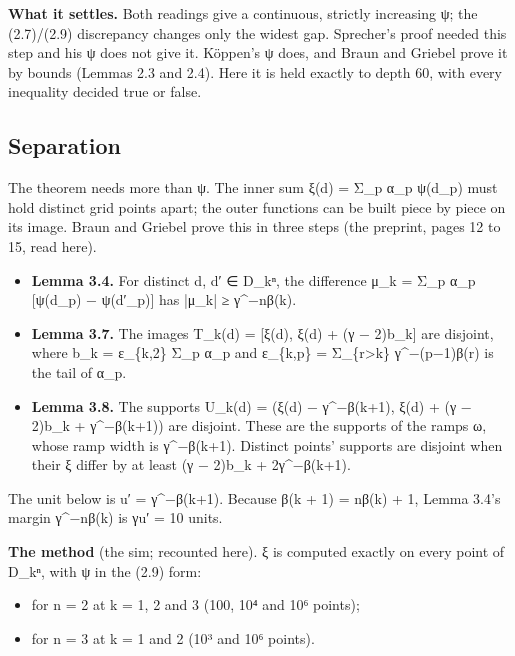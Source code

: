 \textbf{What it settles.} Both readings give a continuous, strictly increasing ψ; the (2.7)/(2.9) discrepancy changes only the widest gap. Sprecher's proof needed this step and his ψ does not give it. Köppen's ψ does, and Braun and Griebel prove it by bounds (Lemmas 2.3 and 2.4). Here it is held exactly to depth 60, with every inequality decided true or false.

\subsection{\texorpdfstring{Separation}{Separation}}

The theorem needs more than ψ. The inner sum ξ(d) = Σ\_\allowbreak{}p α\_\allowbreak{}p ψ(d\_\allowbreak{}p) must hold distinct grid points apart; the outer functions can be built piece by piece on its image. Braun and Griebel prove this in three steps (the preprint, pages 12 to 15, read here).

\begin{itemize}
\item \textbf{Lemma 3.4.} For distinct d, d′ ∈ D\_\allowbreak{}kⁿ, the difference μ\_\allowbreak{}k = Σ\_\allowbreak{}p α\_\allowbreak{}p [ψ(d\_\allowbreak{}p) − ψ(d′\_\allowbreak{}p)] has |μ\_\allowbreak{}k| ≥ γ\textasciicircum{}−nβ(k).
\item \textbf{Lemma 3.7.} The images T\_\allowbreak{}k(d) = [ξ(d), ξ(d) + (γ − 2)b\_\allowbreak{}k] are disjoint, where b\_\allowbreak{}k = ε\_\allowbreak{}\{k,2\} Σ\_\allowbreak{}p α\_\allowbreak{}p and ε\_\allowbreak{}\{k,p\} = Σ\_\allowbreak{}\{r>k\} γ\textasciicircum{}−(p−1)β(r) is the tail of α\_\allowbreak{}p.
\item \textbf{Lemma 3.8.} The supports U\_\allowbreak{}k(d) = (ξ(d) − γ\textasciicircum{}−β(k+1), ξ(d) + (γ − 2)b\_\allowbreak{}k + γ\textasciicircum{}−β(k+1)) are disjoint. These are the supports of the ramps ω, whose ramp width is γ\textasciicircum{}−β(k+1). Distinct points' supports are disjoint when their ξ differ by at least (γ − 2)b\_\allowbreak{}k + 2γ\textasciicircum{}−β(k+1).
\end{itemize}

The unit below is u′ = γ\textasciicircum{}−β(k+1). Because β(k + 1) = nβ(k) + 1, Lemma 3.4's margin γ\textasciicircum{}−nβ(k) is γu′ = 10 units.

\textbf{The method} (the sim; recounted here). ξ is computed exactly on every point of D\_\allowbreak{}kⁿ, with ψ in the (2.9) form:

\begin{itemize}
\item for n = 2 at k = 1, 2 and 3 (100, 10⁴ and 10⁶ points);
\item for n = 3 at k = 1 and 2 (10³ and 10⁶ points).
\end{itemize}

